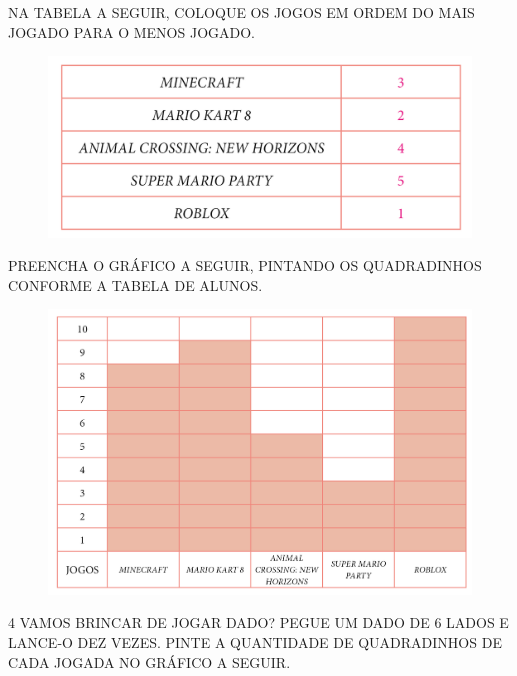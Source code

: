 \begin{escolha}
\item NA TABELA A SEGUIR, COLOQUE OS JOGOS EM ORDEM DO MAIS JOGADO PARA O MENOS JOGADO.

\begin{figure}[htpb!]
\centering
\includegraphics[width=.6\textwidth]{../ilustracoes/MAT1/SAEB_1ANO_MAT_FIGURA100.png}
\end{figure}

\item PREENCHA O GRÁFICO A SEGUIR, PINTANDO OS QUADRADINHOS CONFORME A TABELA DE ALUNOS.

\begin{figure}[htpb!]
\centering
\includegraphics[width=.7\textwidth]{../ilustracoes/MAT1/SAEB_1ANO_MAT_FIGURA101.png}
\end{figure}
\end{escolha}


\num{4} VAMOS BRINCAR DE JOGAR DADO? PEGUE UM DADO DE 6 LADOS E LANCE-O DEZ
VEZES. PINTE A QUANTIDADE DE QUADRADINHOS DE CADA JOGADA NO GRÁFICO
A SEGUIR.


